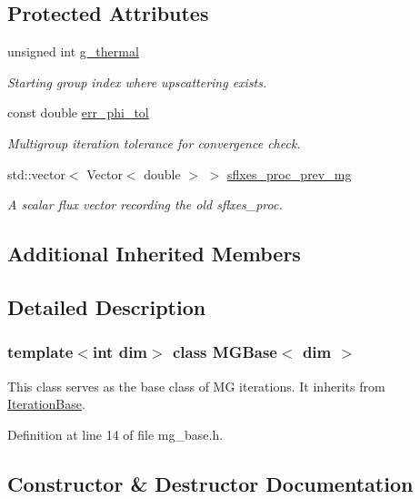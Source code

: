 \subsection*{Protected Attributes}
\begin{DoxyCompactItemize}
\item 
unsigned int \hyperlink{class_m_g_base_a7df1f6ce51cf6eb033420be98b1f0019}{g\+\_\+thermal}
\begin{DoxyCompactList}\small\item\em Starting group index where upscattering exists. \end{DoxyCompactList}\item 
const double \hyperlink{class_m_g_base_af50b1bdc92270c342524eacfc644170c}{err\+\_\+phi\+\_\+tol}
\begin{DoxyCompactList}\small\item\em Multigroup iteration tolerance for convergence check. \end{DoxyCompactList}\item 
std\+::vector$<$ Vector$<$ double $>$ $>$ \hyperlink{class_m_g_base_ad8a9d4163bb31470fff74fe787c23788}{sflxes\+\_\+proc\+\_\+prev\+\_\+mg}
\begin{DoxyCompactList}\small\item\em A scalar flux vector recording the old sflxes\+\_\+proc. \end{DoxyCompactList}\end{DoxyCompactItemize}
\subsection*{Additional Inherited Members}


\subsection{Detailed Description}
\subsubsection*{template$<$int dim$>$\newline
class M\+G\+Base$<$ dim $>$}

This class serves as the base class of MG iterations. It inherits from \hyperlink{class_iteration_base}{Iteration\+Base}. 

Definition at line 14 of file mg\+\_\+base.\+h.



\subsection{Constructor \& Destructor Documentation}
\mbox{\label{class_m_g_base_ad938184229e773a339be9ba1fc487aa1}} 

